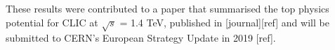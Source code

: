 These results were contributed to a paper that summarised the top physics potential for \acrshort{CLIC} at $\sqrt{s}$ = 1.4 TeV, published in [journal][ref] and will be submitted to CERN's European Strategy Update in 2019 [ref].















